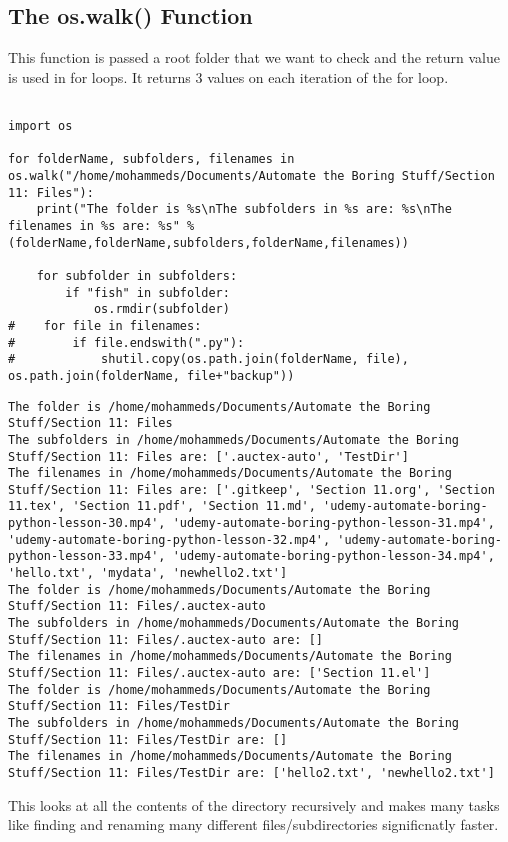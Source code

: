 \documentclass[11pt]{article}
\begin{document}
\subsection{The os.walk() Function}
\label{sec:org79fabf1}

This function is passed a root folder that we want to check and the return value is used in for loops. It returns 3 values on each iteration of the for loop.

\begin{verbatim}

import os

for folderName, subfolders, filenames in os.walk("/home/mohammeds/Documents/Automate the Boring Stuff/Section 11: Files"):
    print("The folder is %s\nThe subfolders in %s are: %s\nThe filenames in %s are: %s" % (folderName,folderName,subfolders,folderName,filenames))

    for subfolder in subfolders:
        if "fish" in subfolder:
            os.rmdir(subfolder)
#    for file in filenames:
#        if file.endswith(".py"):
#            shutil.copy(os.path.join(folderName, file), os.path.join(folderName, file+"backup"))

\end{verbatim}

\begin{verbatim}
The folder is /home/mohammeds/Documents/Automate the Boring Stuff/Section 11: Files
The subfolders in /home/mohammeds/Documents/Automate the Boring Stuff/Section 11: Files are: ['.auctex-auto', 'TestDir']
The filenames in /home/mohammeds/Documents/Automate the Boring Stuff/Section 11: Files are: ['.gitkeep', 'Section 11.org', 'Section 11.tex', 'Section 11.pdf', 'Section 11.md', 'udemy-automate-boring-python-lesson-30.mp4', 'udemy-automate-boring-python-lesson-31.mp4', 'udemy-automate-boring-python-lesson-32.mp4', 'udemy-automate-boring-python-lesson-33.mp4', 'udemy-automate-boring-python-lesson-34.mp4', 'hello.txt', 'mydata', 'newhello2.txt']
The folder is /home/mohammeds/Documents/Automate the Boring Stuff/Section 11: Files/.auctex-auto
The subfolders in /home/mohammeds/Documents/Automate the Boring Stuff/Section 11: Files/.auctex-auto are: []
The filenames in /home/mohammeds/Documents/Automate the Boring Stuff/Section 11: Files/.auctex-auto are: ['Section 11.el']
The folder is /home/mohammeds/Documents/Automate the Boring Stuff/Section 11: Files/TestDir
The subfolders in /home/mohammeds/Documents/Automate the Boring Stuff/Section 11: Files/TestDir are: []
The filenames in /home/mohammeds/Documents/Automate the Boring Stuff/Section 11: Files/TestDir are: ['hello2.txt', 'newhello2.txt']
\end{verbatim}


This looks at all the contents of the directory recursively and makes many tasks like finding and renaming many different files/subdirectories significnatly faster.
\end{document}

